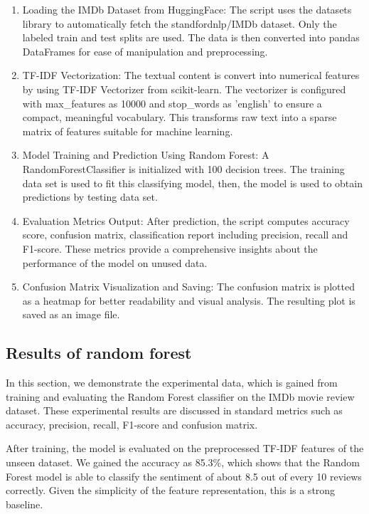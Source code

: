 \begin{enumerate}
    \item Loading the IMDb Dataset from HuggingFace: The script uses the datasets library to automatically fetch the standfordnlp/IMDb dataset. Only the labeled train and test splits are used. The data is then converted into pandas DataFrames for ease of manipulation and preprocessing.
    \item TF-IDF Vectorization: The textual content is convert into numerical features by using TF-IDF Vectorizer from scikit-learn. The vectorizer is configured with max\_features as 10000 and stop\_words as 'english' to ensure a compact, meaningful vocabulary. This transforms raw text into a sparse matrix of features suitable for machine learning.
    \item Model Training and Prediction Using Random Forest: A RandomForestClassifier is initialized with 100 decision trees. The training data set is used to fit this classifying model, then, the model is used to obtain predictions by testing data set.
    \item Evaluation Metrics Output: After prediction, the script computes accuracy score, confusion matrix, classification report including precision, recall and F1-score. These metrics provide a comprehensive insights about the performance of the model on unused data.
    \item Confusion Matrix Visualization and Saving: The confusion matrix is plotted as a heatmap for better readability and visual analysis. The resulting plot is saved as an image file.
\end{enumerate}


\subsection{Results of random forest}
In this section, we demonstrate the experimental data, which is gained from training and evaluating the Random Forest classifier on the IMDb movie review dataset. These experimental results are discussed in standard metrics such as accuracy, precision, recall, F1-score and confusion matrix.

After training, the model is evaluated on the preprocessed TF-IDF features of the unseen dataset. We gained the accuracy as 85.3\%, which shows that the Random Forest model is able to classify the sentiment of about 8.5 out of every 10 reviews correctly. Given the simplicity of the feature representation, this is a strong baseline.

